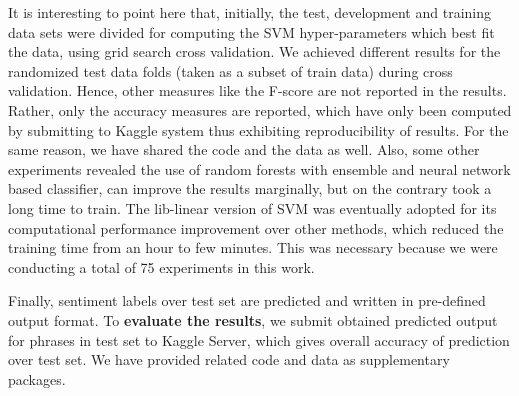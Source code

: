 It is interesting to point here that, initially, the test, development and training data sets were divided for computing the SVM hyper-parameters which best fit the data, using grid search cross validation. We achieved different results for the randomized test data folds (taken as a subset of train data) during cross validation. Hence, other measures like the F-score are not reported in the results. Rather, only the accuracy measures are reported, which have only been computed by submitting to Kaggle system thus exhibiting reproducibility of  results. For the same reason, we have shared the code and the data as well. Also, some other experiments revealed the use of random forests with ensemble and neural network based classifier, can improve the results marginally, but on the contrary took a long time to train. The lib-linear version of SVM was eventually adopted for its computational performance improvement over other methods, which reduced the training time from an hour to few minutes. This was necessary because we were conducting a total of 75 experiments in this work.
\newline

Finally, sentiment labels over test set are predicted and written in pre-defined output format. To \textbf{evaluate the results}, we submit obtained predicted output for phrases in test set to Kaggle Server\footnotemark {}, which gives overall accuracy of prediction over test set. We have provided related code and data as supplementary packages\footnotemark {}.

